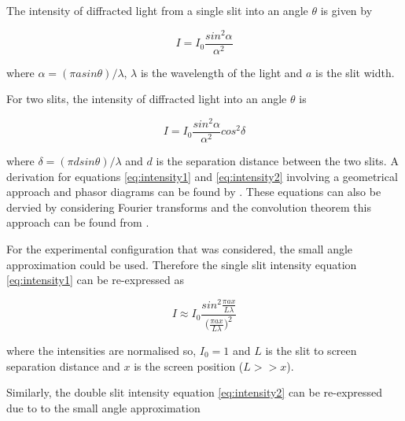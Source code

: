 \documentclass{article}
\begin{document}
\vspace{2mm}
\noindent
The intensity of diffracted light from a single slit into an angle $\theta$ \cite{Paper02} is given by

\begin{equation}
\label{eq:intensity1}
I = I_0 \frac{sin^2{\alpha}}{\alpha^2}
\end{equation}

\vspace{2mm}
\noindent
where $\alpha = ({\pi asin{\theta}}) / {\lambda}$, $\lambda$ is the wavelength of the light and $a$ is the slit width.

\vspace{2mm}
\noindent
For two slits, the intensity of diffracted light into an angle $\theta$ \cite{Paper02} is

\begin{equation}
\label{eq:intensity2}
I = I_0 \frac{sin^2{\alpha}}{\alpha^2} cos^2{\delta}
\end{equation}

\vspace{2mm}
\noindent
where $\delta = ({\pi dsin{\theta}}) / {\lambda}$ and $d$ is the separation distance between the two slits. A derivation for equations \eqref{eq:intensity1} and \eqref{eq:intensity2} involving a geometrical approach and phasor diagrams can be found by \cite{Book01}. These equations can also be dervied by considering Fourier transforms and the convolution theorem this approach can be found from \cite{Web01}.

\vspace{2mm}
\noindent
For the experimental configuration that was considered, the small angle approximation could be used. Therefore the single slit intensity equation \eqref{eq:intensity1} can be re-expressed as

\begin{equation}
\label{eq:intensity_small1}
I \approx I_0 \frac{sin^2{\frac{\pi a x}{L \lambda}}}{\big(\frac{\pi a x}{L \lambda}\big)^2}
\end{equation}

\vspace{2mm}
\noindent
where the intensities are normalised so, $I_0 = 1$ and $L$ is the slit to screen separation distance and $x$ is the screen position ($L >> x$).

\vspace{2mm}
\noindent
Similarly, the double slit intensity equation \eqref{eq:intensity2} can be re-expressed due to to the small angle approximation
\end{document}
